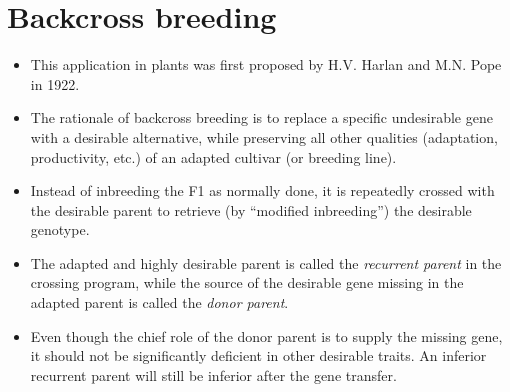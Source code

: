 \documentclass[11pt,ignorenonframetext,aspectratio=169]{beamer}
\providecommand{\tightlist}{%
  \setlength{\itemsep}{0pt}\setlength{\parskip}{0pt}}
\begin{document}
\hypertarget{backcross-breeding}{%
\section{Backcross breeding}\label{backcross-breeding}}

\begin{frame}{}
\protect\hypertarget{section-12}{}
\begin{itemize}
\tightlist
\item
  This application in plants was first proposed by H.V. Harlan and M.N.
  Pope in 1922.
\item
  The rationale of backcross breeding is to replace a specific
  undesirable gene with a desirable alternative, while preserving all
  other qualities (adaptation, productivity, etc.) of an adapted
  cultivar (or breeding line).
\item
  Instead of inbreeding the F1 as normally done, it is repeatedly
  crossed with the desirable parent to retrieve (by ``modified
  inbreeding'') the desirable genotype.
\item
  The adapted and highly desirable parent is called the \emph{recurrent
  parent} in the crossing program, while the source of the desirable
  gene missing in the adapted parent is called the \emph{donor parent}.
\item
  Even though the chief role of the donor parent is to supply the
  missing gene, it should not be significantly deficient in other
  desirable traits. An inferior recurrent parent will still be inferior
  after the gene transfer.
\end{itemize}
\end{frame}
\end{document}
